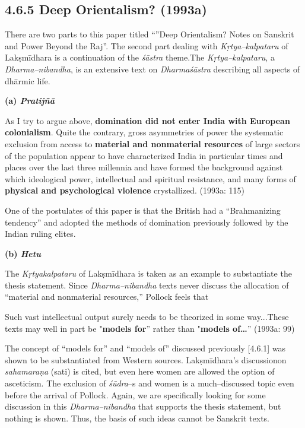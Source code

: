 \subsection*{4.6.5 Deep Orientalism? (1993a)}

There are two parts to this paper titled “”Deep Orientalism? Notes on Sanskrit and Power Beyond the Raj”. The second part dealing with \textit{Kṛtya–kalpataru }of Lakṣmīdhara is a continuation of the \textit{śāstra} theme.The \textit{Kṛtya–kalpataru}, a \textit{Dharma–nibandha}, is an extensive text on \textit{Dharmaśāstra} describing all aspects of dhārmic life.

\textbf{(a) \textit{Pratijñā }}

\begin{myquote}
As I try to argue above, \textbf{domination did not enter India with European colonialism}. Quite the contrary, gross asymmetries of power the systematic exclusion from access to \textbf{material and nonmaterial resources} of large sectors of the population appear to have characterized India in particular times and places over the last three millennia and have formed the background against which ideological power, intellectual and spiritual resistance, and many forms of \textbf{physical and psychological violence} crystallized. (1993a: 115)
\end{myquote}

One of the postulates of this paper is that the British had a “Brahmanizing tendency” and adopted the methods of domination previously followed by the Indian ruling elites.

\textbf{(b) \textit{Hetu}}

The \textit{Kṛtyakalpataru }of Lakṣmīdhara is taken as an example to substantiate the thesis statement. Since \textit{Dharma–nibandha} texts never discuss the allocation of “material and nonmaterial resources,” Pollock feels that

\begin{myquote}
Such vast intellectual output surely needs to be theorized in some way...These texts may well in part be "\textbf{models for}'' rather than "\textbf{models of…}” (1993a: 99)
\end{myquote}

The concept of “models for” and “models of” discussed previously [4.6.1] was shown to be substantiated from Western sources. Lakṣmīdhara’s discussionon \textit{sahamaraṇa} (sati) is cited, but even here women are allowed the option of asceticism. The exclusion of \textit{śūdra}–s and women is a much–discussed topic even before the arrival of Pollock. Again, we are specifically looking for some discussion in this \textit{Dharma–nibandha} that supports the thesis statement, but nothing is shown. Thus, the basis of such ideas cannot be Sanskrit texts.

